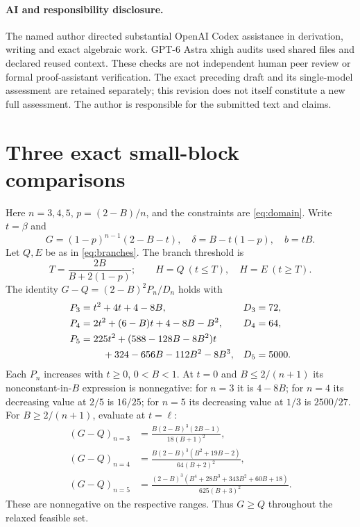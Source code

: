 \documentclass[11pt]{article}
\begin{document}
\paragraph{AI and responsibility disclosure.}
The named author directed substantial OpenAI Codex assistance in
derivation, writing and exact algebraic work. GPT-6 Astra xhigh audits
used shared files and declared reused context. These checks are not
independent human peer review or formal proof-assistant verification.
The exact preceding draft and its single-model assessment are retained
separately; this revision does not itself constitute a new full assessment.
The author is responsible for the submitted text and claims.

\appendix
\section{Three exact small-block comparisons}\label{app:small}
Here $n=3,4,5$, $p=(2-B)/n$, and the constraints are
\eqref{eq:domain}. Write $t=\beta$ and
\[
 G=(1-p)^{n-1}(2-B-t),\quad \delta=B-t(1-p),\quad b=tB.
\]
Let $Q,E$ be as in \eqref{eq:branches}. The branch threshold is
\[
 T=\frac{2B}{B+2(1-p)};
 \qquad H=Q\ (t\le T),\quad H=E\ (t\ge T).
\]
The identity $G-Q=(2-B)^2P_n/D_n$ holds with
\begin{align*}
 P_3&=t^2+4t+4-8B,&D_3&=72,\\
 P_4&=2t^2+(6-B)t+4-8B-B^2,&D_4&=64,\\
 P_5&=225t^2+(588-128B-8B^2)t\\
 &\hspace{8mm}+324-656B-112B^2-8B^3,&D_5&=5000.
\end{align*}
Each $P_n$ increases with $t\ge0$, $0<B<1$. At $t=0$ and
$B\le2/(n+1)$ its nonconstant-in-$B$ expression is nonnegative:
for $n=3$ it is $4-8B$; for $n=4$ its decreasing value at $2/5$
is $16/25$; for $n=5$ its decreasing value at $1/3$ is $2500/27$.
For $B\ge2/(n+1)$, evaluate at $t=\ell$:
\begin{align*}
 (G-Q)_{n=3}&=\frac{B(2-B)^3(2B-1)}{18(B+1)^2},\\
 (G-Q)_{n=4}&=\frac{B(2-B)^3(B^2+19B-2)}{64(B+2)^2},\\
 (G-Q)_{n=5}&=\frac{(2-B)^3(B^4+28B^3+343B^2+60B+18)}{625(B+3)^2}.
\end{align*}
These are nonnegative on the respective ranges. Thus $G\ge Q$
throughout the relaxed feasible set.
\end{document}

